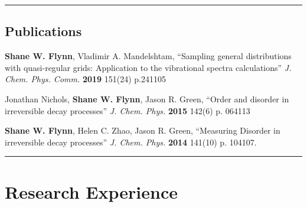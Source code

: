 \documentclass[letterpaper]{article}
\renewenvironment{itemize}{
  \begin{list}{}{
    \setlength{\leftmargin}{1.5em}
  }
}{
  \end{list}
}
\begin{document}
\vspace{0.1in}
\hrule
\subsection*{Publications}

\begin{itemize}
\item \textbf{Shane W. Flynn}, Vladimir A. Mandelshtam,
      ``Sampling general distributions with quasi-regular grids: Application to
      the vibrational spectra calculations'' \textit{J. Chem. Phys. Comm.}
      \textbf{2019} 151(24) p.241105

\item Jonathan Nichols, \textbf{Shane W. Flynn}, Jason R. Green,
      ``Order and disorder in irreversible decay processes''
      \textit{J. Chem. Phys.} \textbf{2015} 142(6) p. 064113

\item \textbf{Shane W. Flynn}, Helen C. Zhao, Jason R. Green,
      ``Measuring Disorder in irreversible decay processes''
      \textit{J. Chem. Phys.} \textbf{2014} 141(10) p. 104107.
\end{itemize}

\vspace{0.1in}
\hrule

\section*{Research Experience}
\end{document}
